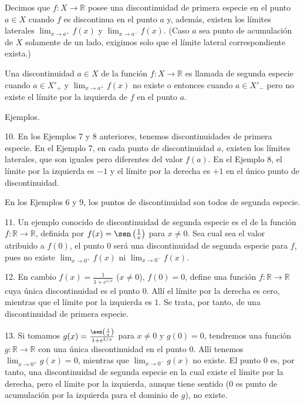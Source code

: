 \documentclass[12pt,oneside]{book}
\begin{document}
Decimos que \(f: X \to \mathbb{R}\) posee una discontinuidad de primera especie en el punto \(a \in X\) cuando \(f\) es discontinua en el punto \(a\) y, además, existen los límites laterales \(\lim_{x \to a^+} f(x)\) y \(\lim_{x \to a^-} f(x)\). (Caso \(a\) sea punto de acumulación de \(X\) solamente de un lado, exigimos solo que el límite lateral correspondiente exista.)

Una discontinuidad \(a \in X\) de la función \(f: X \to \mathbb{R}\) es llamada de segunda especie cuando \(a \in X'_+\) y \(\lim_{x \to a^+} f(x)\) no existe o entonces cuando \(a \in X'_-\) pero no existe el límite por la izquierda de \(f\) en el punto \(a\).

Ejemplos.

10. En los Ejemplos 7 y 8 anteriores, tenemos discontinuidades de primera especie. En el Ejemplo 7, en cada punto de discontinuidad \(a\), existen los límites laterales, que son iguales pero diferentes del valor \(f(a)\). En el Ejemplo 8, el límite por la izquierda es \(-1\) y el límite por la derecha es \(+1\) en el único punto de discontinuidad.

En los Ejemplos 6 y 9, los puntos de discontinuidad son todos de segunda especie.

11. Un ejemplo conocido de discontinuidad de segunda especie es el de la función \(f: \mathbb{R} \to \mathbb{R}\), definida por \(f(x) = \sen \left( \frac{1}{x} \right)\) para \(x \neq 0\). Sea cual sea el valor atribuido a \(f(0)\), el punto \(0\) será una discontinuidad de segunda especie para \(f\), pues no existe \(\lim_{x \to 0^+} f(x)\) ni \(\lim_{x \to 0^-} f(x)\).

12. En cambio \(f(x) = \frac{1}{1 + e^{1/x}}\) (\(x \neq 0\)), \(f(0) = 0\), define una función \(f: \mathbb{R} \to \mathbb{R}\) cuya única discontinuidad es el punto \(0\). Allí el límite por la derecha es cero, mientras que el límite por la izquierda es \(1\). Se trata, por tanto, de una discontinuidad de primera especie.

13. Si tomamos \(g(x) = \frac{\sen \left( \frac{1}{x} \right)}{1 + e^{1/x}}\) para \(x \neq 0\) y \(g(0) = 0\), tendremos una función \(g: \mathbb{R} \to \mathbb{R}\) con una única discontinuidad en el punto \(0\). Allí tenemos \(\lim_{x \to 0^+} g(x) = 0\), mientras que \(\lim_{x \to 0^-} g(x)\) no existe. El punto \(0\) es, por tanto, una discontinuidad de segunda especie en la cual existe el límite por la derecha, pero el límite por la izquierda, aunque tiene sentido (\(0\) es punto de acumulación por la izquierda para el dominio de \(g\)), no existe.
\end{document}
